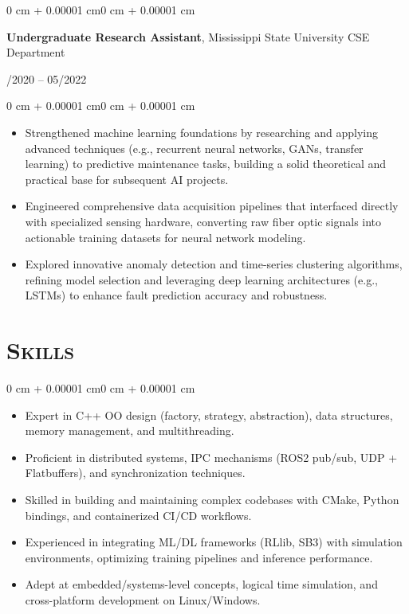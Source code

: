 \documentclass[11pt, letterpaper]{article}
\newenvironment{highlights}{
    \begin{itemize}[
        topsep=0.10 cm,
        parsep=0.10 cm,
        partopsep=0pt,
        itemsep=0pt,
        leftmargin=0.4 cm + 10pt
    ]
}{
    \end{itemize}
}
\newenvironment{onecolentry}{
    \begin{adjustwidth}{0 cm + 0.00001 cm}{0 cm + 0.00001 cm}
}{
    \end{adjustwidth}
}
\newenvironment{twocolentry}[1]{
    \onecolentry
    \def\secondColumn{#1}
    \setcolumnwidth{\fill,4.5cm}
    \begin{paracol}{2}
}{
    \switchcolumn \raggedleft \secondColumn
    \end{paracol}
    \endonecolentry
}
\begin{document}
\vspace{0.4 cm}

\begin{twocolentry}{09/2020 – 05/2022}
    \textbf{Undergraduate Research Assistant}, Mississippi State University CSE Department
\end{twocolentry}

\vspace{0.10 cm}
\begin{onecolentry}
    \begin{highlights}
        \item Strengthened machine learning foundations by researching and applying advanced techniques (e.g., recurrent neural networks, GANs, transfer learning) to predictive maintenance tasks, building a solid theoretical and practical base for subsequent AI projects.
        \item Engineered comprehensive data acquisition pipelines that interfaced directly with specialized sensing hardware, converting raw fiber optic signals into actionable training datasets for neural network modeling.
        \item Explored innovative anomaly detection and time-series clustering algorithms, refining model selection and leveraging deep learning architectures (e.g., LSTMs) to enhance fault prediction accuracy and robustness.
    \end{highlights}
\end{onecolentry}

\section{\scshape Skills}

\begin{onecolentry}
    \begin{highlights}
        \item Expert in C++ OO design (factory, strategy, abstraction), data structures, memory management, and multithreading.
        \item Proficient in distributed systems, IPC mechanisms (ROS2 pub/sub, UDP + Flatbuffers), and synchronization techniques.
        \item Skilled in building and maintaining complex codebases with CMake, Python bindings, and containerized CI/CD workflows.
        \item Experienced in integrating ML/DL frameworks (RLlib, SB3) with simulation environments, optimizing training pipelines and inference performance.
        \item Adept at embedded/systems-level concepts, logical time simulation, and cross-platform development on Linux/Windows.
    \end{highlights}
\end{onecolentry}
\end{document}
